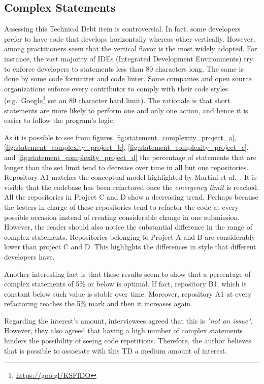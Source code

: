 	
	\subsection{Complex Statements}
	
	
	Assessing this Technical Debt item is controversial. In fact, some developers prefer to have code that develops horizontally whereas other vertically. However, among practitioners seem that the vertical flavor is the most widely adopted. For instance, the vast majority of IDEs (Integrated Development Environments) try to enforce developers to statements less than 80 characters long. The same is done by some code formatter and code linter. Some companies and open source organizations enforce every contributor to comply with their code styles (e.g.\ Google\footnote{\href{https://goo.gl/KSFfDO}{https://goo.gl/KSFfDO}} set an 80 character hard limit). The rationale is that short statements are more likely to perform one and only one action, and hence it is easier to follow the program's logic.

    As it is possible to see from figures \ref{fig:statement_complexity_project_a}, \ref{fig:statement_complexity_project_b}, \ref{fig:statement_complexity_project_c}, and \ref{fig:statement_complexity_project_d} the percentage of statements that are longer than the set limit tend to decrease over time in all but one repositories. Repository A1 matches the conceptual model highlighted by Martini et al.\ . It is visible that the codebase has been refactored once the \textit{emergency limit} is reached. All the repositories in Project C and D show a decreasing trend. Perhaps because the testers in charge of these repositories tend to refactor the code at every possible occasion instead of creating considerable change in one submission. However, the reader should also notice the substantial difference in the range of complex statements. Repositories belonging to Project A and B are considerably lower than project C and D. This highlights the differences in style that different developers have. 
    
    Another interesting fact is that these results seem to show that a percentage of complex statements of 5\% or below is optimal. If fact, repository B1, which is constant below such value is stable over time. Moreover, repository A1 at every refactoring reaches the 5\% mark and then it increases again.
    
     \label{sec:disc-rq3-complex-statements}
    Regarding the interest's amount, interviewees agreed that this is \textit{"not an issue"}. However, they also agreed that having a high number of complex statements hinders the possibility of seeing code repetitions. Therefore, the author believes that is possible to associate with this TD a medium amount of interest.
    
